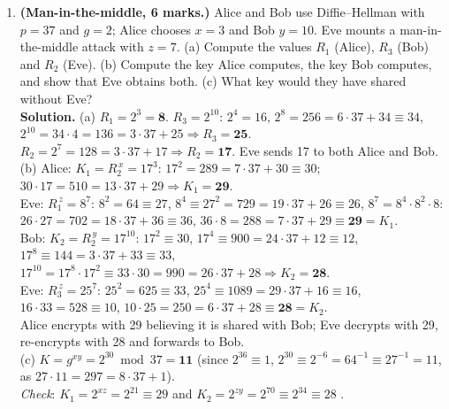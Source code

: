 \begin{enumerate}[leftmargin=1.6em,itemsep=4pt]
  \item \textbf{(Man-in-the-middle, 6 marks.)} Alice and Bob use Diffie--Hellman with $p = 37$ and $g = 2$; Alice chooses $x = 3$ and Bob $y = 10$. Eve mounts a man-in-the-middle attack with $z = 7$. (a) Compute the values $R_1$ (Alice), $R_3$ (Bob) and $R_2$ (Eve). (b) Compute the key Alice computes, the key Bob computes, and show that Eve obtains both. (c) What key would they have shared without Eve?\\
  \textbf{Solution.} (a) $R_1 = 2^3 = \mathbf{8}$. $R_3 = 2^{10}$: $2^4 = 16$, $2^8 = 256 = 6 \cdot 37 + 34 \equiv 34$, $2^{10} = 34 \cdot 4 = 136 = 3 \cdot 37 + 25 \Rightarrow R_3 = \mathbf{25}$. $R_2 = 2^7 = 128 = 3 \cdot 37 + 17 \Rightarrow R_2 = \mathbf{17}$. Eve sends 17 to both Alice and Bob.\\
  (b) Alice: $K_1 = R_2^{\,x} = 17^3$: $17^2 = 289 = 7 \cdot 37 + 30 \equiv 30$; $30 \cdot 17 = 510 = 13 \cdot 37 + 29 \Rightarrow K_1 = \mathbf{29}$.\\
  Eve: $R_1^{\,z} = 8^7$: $8^2 = 64 \equiv 27$, $8^4 \equiv 27^2 = 729 = 19 \cdot 37 + 26 \equiv 26$, $8^7 = 8^4 \cdot 8^2 \cdot 8$: $26 \cdot 27 = 702 = 18 \cdot 37 + 36 \equiv 36$, $36 \cdot 8 = 288 = 7 \cdot 37 + 29 \equiv \mathbf{29} = K_1$.\\
  Bob: $K_2 = R_2^{\,y} = 17^{10}$: $17^2 \equiv 30$, $17^4 \equiv 900 = 24 \cdot 37 + 12 \equiv 12$, $17^8 \equiv 144 = 3 \cdot 37 + 33 \equiv 33$, $17^{10} = 17^8 \cdot 17^2 \equiv 33 \cdot 30 = 990 = 26 \cdot 37 + 28 \Rightarrow K_2 = \mathbf{28}$.\\
  Eve: $R_3^{\,z} = 25^7$: $25^2 = 625 \equiv 33$, $25^4 \equiv 1089 = 29 \cdot 37 + 16 \equiv 16$, $16 \cdot 33 = 528 \equiv 10$, $10 \cdot 25 = 250 = 6 \cdot 37 + 28 \equiv \mathbf{28} = K_2$.\\
  Alice encrypts with 29 believing it is shared with Bob; Eve decrypts with 29, re-encrypts with 28 and forwards to Bob.\\
  (c) $K = g^{xy} = 2^{30} \bmod 37 = \mathbf{11}$ (since $2^{36} \equiv 1$, $2^{30} \equiv 2^{-6} = 64^{-1} \equiv 27^{-1} = 11$, as $27 \cdot 11 = 297 = 8 \cdot 37 + 1$).\\
  \emph{Check}: $K_1 = 2^{xz} = 2^{21} \equiv 29$ and $K_2 = 2^{zy} = 2^{70} \equiv 2^{34} \equiv 28$ \checkmark.


\end{enumerate}
